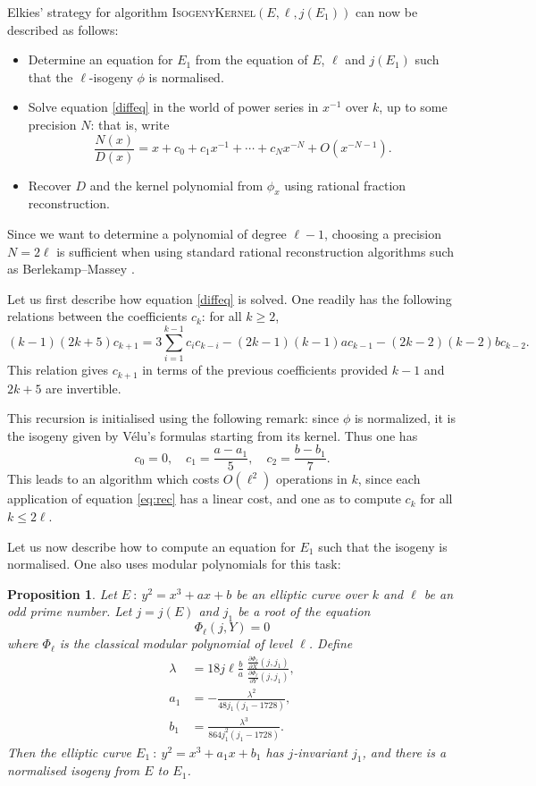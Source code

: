 \documentclass{article}
\newcommand{\algstyle}[1]{\textsc{#1}}
\newtheorem{prop}[theorem]{Proposition}
\theoremstyle{definition}
\begin{document}
Elkies' strategy for algorithm \algstyle{IsogenyKernel}$(E, \ell, j(E_1))$ can now be described
as follows:
\begin{itemize}
\item Determine an equation for $E_1$ from the equation of $E$, $\ell$ and
 $j(E_1)$ such that the $\ell$-isogeny $\phi$ is normalised.
\item Solve equation \ref{diffeq} in the world of power series in $x^{-1}$ over $k$, up to
 some precision $N$: that is, write
\[
\frac{N(x)}{D(x)} = x + c_0 + c_1 x^{-1} + \cdots + c_N x^{-N} + O(x^{-N-1}).
\]
\item Recover $D$ and the kernel polynomial from $\phi_x$ using rational
 fraction reconstruction.
\end{itemize}

Since we want to determine a polynomial of degree $\ell-1$, choosing a precision $N = 2\ell$
is sufficient when using standard rational reconstruction algorithms such as Berlekamp--Massey \cite{}.

Let us first describe how equation \ref{diffeq} is solved. One readily
has the following relations between the coefficients $c_k$: for all $k\geq 2$,
\begin{equation}
\label{eq:rec}
 (k-1)(2k+5)c_{k+1} = 3\sum_{i=1}^{k-1}c_i c_{k-i}
	- (2k-1)(k-1)a c_{k-1} - (2k-2)(k-2)b c_{k-2}.
\end{equation}
This relation gives $c_{k+1}$ in terms of the previous coefficients provided $k-1$
and $2k+5$ are invertible.

This recursion is initialised using the following remark: since $\phi$
is normalized,
it is the isogeny given by Vélu's formulas starting from its kernel. Thus
one has
\[
c_0 = 0,\quad c_1 = \frac{a - a_1}{5},\quad c_2 = \frac{b - b_1}{7}.
\]
This leads to an algorithm which costs $O(\ell^2)$ operations in $k$, since each
application of equation \ref{eq:rec} has a linear cost, and one as to compute
$c_k$ for all $k\leq 2\ell$.

Let us now describe how to compute an equation for $E_1$ such that the isogeny
is normalised. One also uses modular polynomials for this task:

\begin{prop}
Let $E\ :\ y^2 = x^3 + ax + b$ be an elliptic curve over $k$
 and $\ell$ be an odd prime number. Let $j = j(E)$ and $j_1$
be a root of the equation
\[
\Phi_\ell(j, Y) = 0
\]
where $\Phi_\ell$ is the classical modular polynomial of level $\ell$.
Define
\begin{equation}
\label{eq:norm}
\begin{aligned}
\lambda &= 18 j \ell \frac{b}{a}\ 
	\frac{\frac{\partial \Phi_\ell}{\partial X}(j, j_1)}
			 {\frac{\partial \Phi_\ell}{\partial Y}(j, j_1)},\\
a_1 &= -\frac{\lambda^2}{48 j_1(j_1 - 1728)},\\
b_1 &= \frac{\lambda^3}{864 j_1^2(j_1 - 1728)}.
\end{aligned}
\end{equation}
Then the elliptic curve $E_1\ :\ y^2 = x^3 + a_1x + b_1$ has $j$-invariant $j_1$,
and there is a normalised isogeny from $E$ to $E_1$.
\end{prop}
\end{document}
